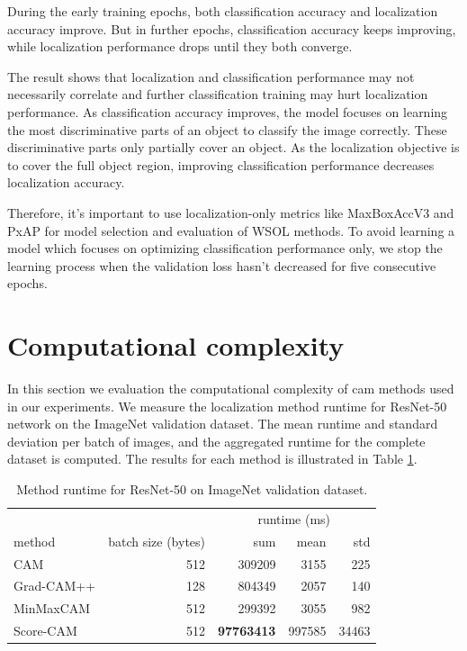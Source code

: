 During the early training epochs, both classification accuracy and localization accuracy improve. But in further epochs, classification accuracy keeps improving, while localization performance drops until they both converge.

The result shows that localization and classification performance may not necessarily correlate and further classification training may hurt localization performance. As classification accuracy improves, the model focuses on learning the most discriminative parts of an object to classify the image correctly. These discriminative parts only partially cover an object. As the localization objective is to cover the full object region, improving classification performance decreases localization accuracy. 

Therefore, it's important to use localization-only metrics like MaxBoxAccV3 and PxAP for model selection and evaluation of WSOL methods. To avoid learning a model which focuses on optimizing classification performance only, we stop the learning process when the validation loss hasn't decreased for five consecutive epochs.

\section{Computational complexity}
In this section we evaluation the computational complexity of \acrshort{cam} methods used in our experiments. We measure the localization method runtime for ResNet-50 network on the ImageNet validation dataset. The mean runtime and standard deviation per batch of images, and the aggregated runtime for the complete  dataset is computed. The results for each method is illustrated in Table \ref{tab:runtime_resnet50_imagenet}.

\begin{table}[ht]
\centering
\begin{tabular}{lrrrr}
\toprule
\multicolumn{2}{c}{} & \multicolumn{3}{c}{runtime (ms)} \\
method & batch size (bytes) & sum & mean & std \\
\cmidrule(lr){1-2} \cmidrule(lr){3-5}
CAM & 512 & 309209 & 3155 & 225 \\
Grad-CAM++ & 128 & 804349 & 2057 & 140 \\
MinMaxCAM & 512 & 299392 & 3055 & 982 \\
Score-CAM & 512 & \bfseries 97763413 & 997585 & 34463\\
\bottomrule
\end{tabular}
\caption[Method runtime for ResNet-50 on ImageNet validation dataset]{Method runtime for ResNet-50 on ImageNet validation dataset.}
\label{tab:runtime_resnet50_imagenet}
\end{table}

